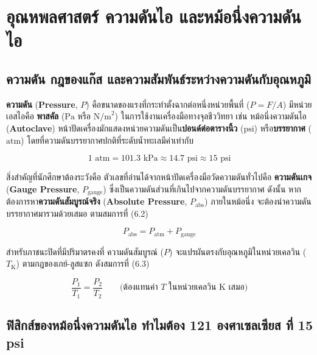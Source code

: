 \clearpage

\chapter{อุณหพลศาสตร์ ความดันไอ และหม้อนึ่งความดันไอ}

\section{ความดัน กฎของแก๊ส และความสัมพันธ์ระหว่างความดันกับอุณหภูมิ}

\textbf{ความดัน} (\textbf{Pressure}, $P$) คือขนาดของแรงที่กระทำตั้งฉากต่อหนึ่งหน่วยพื้นที่ ($P = F/A$) มีหน่วยเอสไอคือ \textbf{พาสคัล} ($\text{Pa}$ หรือ $\text{N/m}^2$) ในการใช้งานเครื่องมือทางจุลชีววิทยา เช่น หม้อนึ่งความดันไอ (\textbf{Autoclave}) หน้าปัดเครื่องมักแสดงหน่วยความดันเป็น\textbf{ปอนด์ต่อตารางนิ้ว} ($\text{psi}$) หรือ\textbf{บรรยากาศ} ($\text{atm}$) โดยที่ความดันบรรยากาศปกติที่ระดับน้ำทะเลมีค่าเท่ากับ

\begin{equation}
    1\text{ atm} = 101.3\text{ kPa} \approx 14.7\text{ psi} \approx 15\text{ psi}
\end{equation}

สิ่งสำคัญที่นักศึกษาต้องระวังคือ ตัวเลขที่อ่านได้จากหน้าปัดเครื่องมือวัดความดันทั่วไปคือ \textbf{ความดันเกจ} (\textbf{Gauge Pressure}, $P_{\text{gauge}}$) ซึ่งเป็นความดันส่วนที่เกินไปจากความดันบรรยากาศ ดังนั้น หากต้องการหา\textbf{ความดันสัมบูรณ์จริง} (\textbf{Absolute Pressure}, $P_{\text{abs}}$) ภายในหม้อนึ่ง จะต้องนำความดันบรรยากาศมารวมด้วยเสมอ ตามสมการที่ (6.2)

\begin{equation}
    P_{\text{abs}} = P_{\text{atm}} + P_{\text{gauge}}
\end{equation}

สำหรับภาชนะปิดที่มีปริมาตรคงที่ ความดันสัมบูรณ์ ($P$) จะแปรผันตรงกับอุณหภูมิในหน่วยเคลวิน ($T_{\text{K}}$) ตามกฎของเกย์-ลูสแซก ดังสมการที่ (6.3)

\begin{equation}
    \frac{P_1}{T_1} = \frac{P_2}{T_2} \qquad \text{(ต้องแทนค่า } T \text{ ในหน่วยเคลวิน } \text{K เสมอ)}
\end{equation}

\section{ฟิสิกส์ของหม้อนึ่งความดันไอ ทำไมต้อง 121 องศาเซลเซียส ที่ 15 psi}

